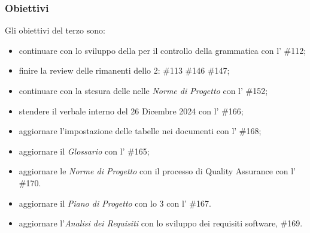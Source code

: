 \subsubsection{Obiettivi}
Gli obiettivi del terzo  sono:
\begin{itemize}
    \item continuare con lo sviluppo della  per il controllo della grammatica con l' \#112;
    \item finire la review delle  rimanenti dello  2: \#113 \#146 \#147;
    \item continuare con la stesura delle  nelle \textit{Norme di Progetto} con l' \#152;
    \item stendere il verbale interno del 26 Dicembre 2024 con l' \#166;
    \item aggiornare l'impostazione delle tabelle nei documenti con l' \#168;
    \item aggiornare il \textit{Glossario} con l' \#165;
    \item aggiornare le \textit{Norme di Progetto} con il processo di Quality Assurance con l' \#170.
    \item aggiornare il \textit{Piano di Progetto} con lo  3 con l' \#167.
    \item aggiornare l'\textit{Analisi dei Requisiti} con lo sviluppo dei requisiti software,  \#169.
\end{itemize}